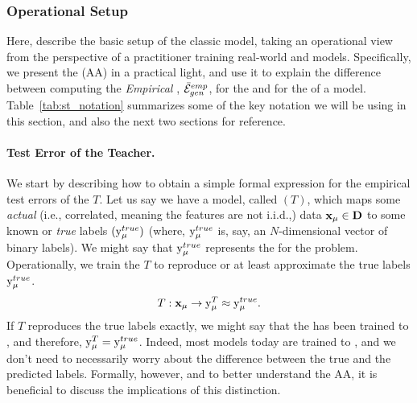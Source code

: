 \subsubsection{Operational Setup}
\label{sxn:ST_OP_setup}


Here, describe the basic setup of the classic \StudentTeacher model, taking an operational view from the perspective of a practitioner training real-world \Student and \Teacher models. Specifically, we present the \AnnealedApproximation (AA) in a practical light,
and use it to explain the difference between computing the \emph{Empirical \GeneralizationError}, $\bar{\mathcal{E}}^{emp}_{gen}$, for the \emph{\TrueAccuracy}
and for the \emph{\Precision} of a \Teacher model.
Table~\ref{tab:st_notation} summarizes some of the key notation we will be using in this section, and also the next two sections for reference.


\paragraph{Test Error of the Teacher.}
We start by describing how to obtain a simple formal expression for the empirical test errors of the \Teacher $T$.
Let us say we have a model, called \Teacher $(T)$, which maps some \emph{actual} (i.e., correlated,  meaning the features are not i.i.d.,) data
$\mathbf{x}_{\mu}\in\mathbf{D}$ to some known or \emph{true} labels $(\mathrm{y}_{\mu}^{true})$
(where,  $\mathrm{y}_{\mu}^{true}$ is, say, an $N$-dimensional vector of binary labels).
We might say that $\mathrm{y}_{\mu}^{true}$ represents the \emph{\GroundTruth} for the problem.
Operationally, we train the \Teacher $T$ to reproduce or at least approximate the true labels $\mathrm{y}_{\mu}^{true}$.
\begin{align}
 T:\mathbf{x}_{\mu}\rightarrow \mathrm{y}_{\mu}^{T} \approx \mathrm{y}_{\mu}^{true}.
\end{align}
If $T$ reproduces the true labels exactly, we might say that the \Teacher has been
trained to \emph{\Interpolation}, and therefore, $\mathrm{y}_{\mu}^{T} = \mathrm{y}_{\mu}^{true}$.
Indeed, most models today are trained to \emph{\Interpolation}, and we don't need to
necessarily worry about the difference between the true and the predicted \Teacher labels.
Formally, however, and to better understand the AA, it is beneficial to discuss the implications
of this distinction.

